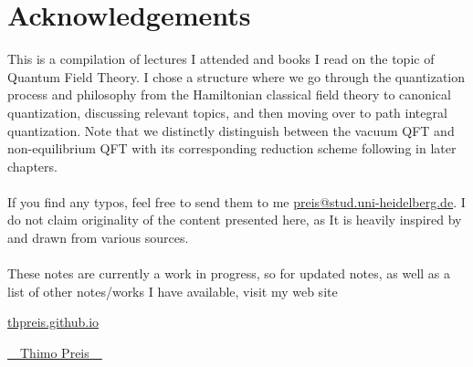 
\newpage
\section*{Acknowledgements}

This is a compilation of lectures I attended and books I read on the topic of Quantum Field Theory. I chose a structure where we go through the quantization process and philosophy from the Hamiltonian classical field theory to canonical quantization, discussing relevant topics, and then moving over to path integral quantization. Note that we distinctly distinguish between the vacuum QFT and non-equilibrium QFT with its corresponding reduction scheme following in later chapters.\\
\\
If you find any typos, feel free to send them to me \href{mailto:preis@stud.uni-heidelberg.de}{preis@stud.uni-heidelberg.de}. I do not claim originality of the content presented here, as It is heavily inspired by and drawn from various sources.
\\
\\
These notes are currently a work in progress, so for updated notes, as well as a list of other notes/works I have available, visit my web site

\begin{center}
    \href{thpreis.github.io}{thpreis.github.io}
\end{center}
\vspace{1cm}

\begin{flushright}
    \Huge{{\cursive\setul{0.1ex}{}\ul{~~Thimo Preis~~}}}
\end{flushright}
